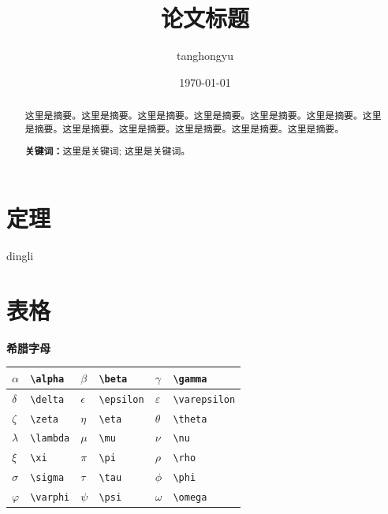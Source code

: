 \documentclass[12pt, a4paper, oneside]{ctexart}
\title{\textbf{论文标题}}
\author{tanghongyu}
\date{\today}
\begin{document}
\maketitle

\setcounter{page}{0}
\maketitle
\thispagestyle{empty}
\newpage
\begin{abstract}
    这里是摘要。这里是摘要。这里是摘要。这里是摘要。这里是摘要。这里是摘要。这里是摘要。这里是摘要。这里是摘要。这里是摘要。这里是摘要。这里是摘要。
    \par\textbf{关键词：}这里是关键词; 这里是关键词。
\end{abstract}

\newpage
{}
\setcounter{page}{1}
\tableofcontents
\newpage
\setcounter{page}{1}

\section{定理}

dingli\cite{elgamal1985public}
\newpage




\section{表格}
 
\begin{table}[!htbp]
    \textbf{希腊字母}
    \vspace{2mm} \\
    \centering
\begin{tabular}{|l|l|l|l|l|l|}
        \hline
    $ \alpha $ & \verb|\alpha|  & $ \beta $    & \verb|\beta|    & $ \gamma $      & \verb|\gamma|      \\ \hline
    $ \delta $ & \verb|\delta|  & $ \epsilon $ & \verb|\epsilon| & $ \varepsilon $ & \verb|\varepsilon| \\ \hline
    $ \zeta  $ & \verb|\zeta|   & $ \eta $     & \verb|\eta|     & $ \theta $      & \verb|\theta|      \\ \hline
    $ \lambda$ & \verb|\lambda| & $ \mu  $     & \verb|\mu|      & $ \nu $         & \verb|\nu|         \\ \hline
    $ \xi    $ & \verb|\xi|     & $ \pi $      & \verb|\pi|      & $ \rho $        & \verb|\rho|        \\ \hline
    $ \sigma $ & \verb|\sigma|  & $ \tau $     & \verb|\tau|     & $ \phi $        & \verb|\phi|        \\ \hline
    $ \varphi$ & \verb|\varphi| & $ \psi $     & \verb|\psi|     & $ \omega $      & \verb|\omega|      \\ \hline
\end{tabular}
\vspace{2mm}  \\
\end{table}
\end{document}
